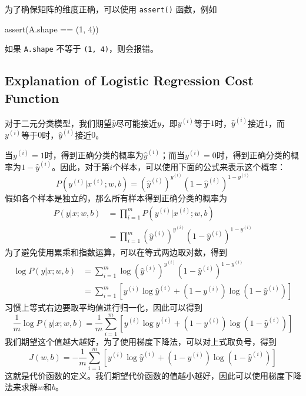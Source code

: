 为了确保矩阵的维度正确，可以使用 \verb|assert()| 函数，例如
\begin{python}
assert(A.shape == (1, 4))
\end{python}
如果 \verb|A.shape| 不等于 \verb|(1, 4)|，则会报错。

\subsection{Explanation of Logistic Regression Cost Function}

对于二元分类模型，我们期望$\hat{y}$尽可能接近$y$，即${y}^{(i)}$等于$1$时，$\hat{y}^{(i)}$接近$1$，而${y}^{(i)}$等于$0$时，$\hat{y}^{(i)}$接近$0$。

当$y^{(i)}=1$时，得到正确分类的概率为$\hat{y}^{(i)}$；而当$y^{(i)}=0$时，得到正确分类的概率为$1-\hat{y}^{(i)}$。因此，对于第$i$个样本，可以使用下面的公式来表示这个概率：
\begin{equation}
    P(y^{(i)} | x^{(i)}; w, b) = (\hat{y}^{(i)})^{y^{(i)}} (1-\hat{y}^{(i)})^{1-y^{(i)}}
\end{equation}
假如各个样本是独立的，那么所有样本得到正确分类的概率为
\begin{equation}
    \begin{aligned}
        P(y | x; w, b) &= \prod_{i=1}^{m} P(y^{(i)} | x^{(i)}; w, b)\\
        &= \prod_{i=1}^{m} (\hat{y}^{(i)})^{y^{(i)}} (1-\hat{y}^{(i)})^{1-y^{(i)}}
    \end{aligned}
\end{equation}
为了避免使用累乘和指数运算，可以在等式两边取对数，得到
\begin{equation}
    \begin{aligned}
        \log P(y | x; w, b) &= \sum_{i=1}^{m} \log (\hat{y}^{(i)})^{y^{(i)}} (1-\hat{y}^{(i)})^{1-y^{(i)}}\\
        &= \sum_{i=1}^{m} \left[ y^{(i)} \log \hat{y}^{(i)} + (1-y^{(i)}) \log (1-\hat{y}^{(i)}) \right]
    \end{aligned}
\end{equation}
习惯上等式右边要取平均值进行归一化，因此可以得到
\begin{equation}
    \frac{1}{m} \log P(y | x; w, b) = \frac{1}{m} \sum_{i=1}^{m} \left[ y^{(i)} \log \hat{y}^{(i)} + (1-y^{(i)}) \log (1-\hat{y}^{(i)}) \right]
\end{equation}
我们期望这个值越大越好，为了使用梯度下降法，可以对上式取负号，得到
\begin{equation}
    J(w, b) = - \frac{1}{m} \sum_{i=1}^{m} \left[ y^{(i)} \log \hat{y}^{(i)} + (1-y^{(i)}) \log (1-\hat{y}^{(i)}) \right]
\end{equation}
这就是代价函数的定义。我们期望代价函数的值越小越好，因此可以使用梯度下降法来求解$w$和$b$。

